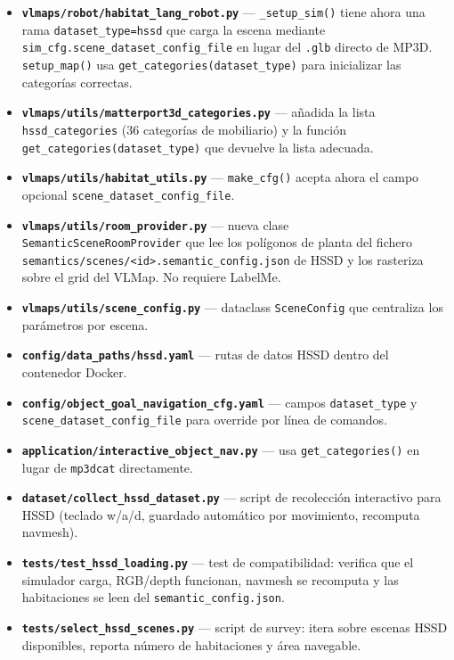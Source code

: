 \documentclass[11pt,a4paper]{article}
\begin{document}
\begin{itemize}
    \item \textbf{\texttt{vlmaps/robot/habitat\_lang\_robot.py}} --- \texttt{\_setup\_sim()} tiene ahora una rama \texttt{dataset\_type=hssd} que carga la escena mediante \texttt{sim\_cfg.scene\_dataset\_config\_file} en lugar del \texttt{.glb} directo de MP3D. \texttt{setup\_map()} usa \texttt{get\_categories(dataset\_type)} para inicializar las categorías correctas.

    \item \textbf{\texttt{vlmaps/utils/matterport3d\_categories.py}} --- añadida la lista \texttt{hssd\_categories} (36 categorías de mobiliario) y la función \texttt{get\_categories(dataset\_type)} que devuelve la lista adecuada.

    \item \textbf{\texttt{vlmaps/utils/habitat\_utils.py}} --- \texttt{make\_cfg()} acepta ahora el campo opcional \texttt{scene\_dataset\_config\_file}.

    \item \textbf{\texttt{vlmaps/utils/room\_provider.py}} --- nueva clase \texttt{SemanticSceneRoomProvider} que lee los polígonos de planta del fichero \texttt{semantics/scenes/<id>.semantic\_config.json} de HSSD y los rasteriza sobre el grid del VLMap. No requiere LabelMe.

    \item \textbf{\texttt{vlmaps/utils/scene\_config.py}} --- dataclass \texttt{SceneConfig} que centraliza los parámetros por escena.

    \item \textbf{\texttt{config/data\_paths/hssd.yaml}} --- rutas de datos HSSD dentro del contenedor Docker.

    \item \textbf{\texttt{config/object\_goal\_navigation\_cfg.yaml}} --- campos \texttt{dataset\_type} y \texttt{scene\_dataset\_config\_file} para override por línea de comandos.

    \item \textbf{\texttt{application/interactive\_object\_nav.py}} --- usa \texttt{get\_categories()} en lugar de \texttt{mp3dcat} directamente.

    \item \textbf{\texttt{dataset/collect\_hssd\_dataset.py}} --- script de recolección interactivo para HSSD (teclado w/a/d, guardado automático por movimiento, recomputa navmesh).

    \item \textbf{\texttt{tests/test\_hssd\_loading.py}} --- test de compatibilidad: verifica que el simulador carga, RGB/depth funcionan, navmesh se recomputa y las habitaciones se leen del \texttt{semantic\_config.json}.

    \item \textbf{\texttt{tests/select\_hssd\_scenes.py}} --- script de survey: itera sobre escenas HSSD disponibles, reporta número de habitaciones y área navegable.
\end{itemize}
\end{document}
